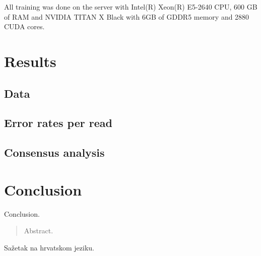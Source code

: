 \documentclass[times, utf8, diplomski, numeric, english]{fer}
\begin{document}
All training was done on the server with  Intel(R) Xeon(R) E5-2640 CPU, 600 GB of RAM and NVIDIA TITAN X Black with 6GB of GDDR5 memory and 2880 CUDA cores.
\chapter{Results}
\section{Data}
\section{Error rates per read}
\section{Consensus analysis}

\chapter{Conclusion}
Conclusion.





\begin{abstract}
Abstract.

\end{abstract}

\begin{sazetak}
Sažetak na hrvatskom jeziku.

\end{sazetak}
\end{document}

